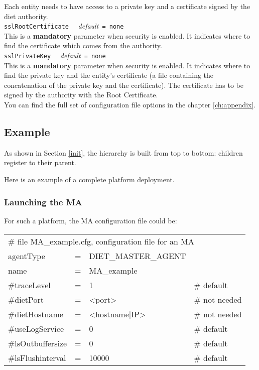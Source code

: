 Each entity needs to have access to a private key and a certificate signed by
the diet authority.\\

\noindent
\texttt{sslRootCertificate} \ \ \emph{default}\texttt{ = none}\\
This is a \textbf{mandatory} parameter when security is enabled. It indicates
where to find the \diet certificate which comes from the authority.\\

\noindent
\texttt{sslPrivateKey} \ \ \emph{default}\texttt{ = none}\\
This is a \textbf{mandatory} parameter when security is enabled. It indicates
where to find the private key and the entity's certificate (a file containing
the concatenation of the private key and the certificate). The certificate
has to be signed by the authority with the Root Certificate.\\

You can find the full set of \diet configuration file options in the chapter
\ref{ch:appendix}.

\subsection{Example}
\label{sec:deploy_ex}

As shown in Section \ref{init}, the hierarchy is built from top to bottom:
children register to their parent.

Here is an example of a complete platform deployment.
\subsubsection{Launching the MA}

For such a platform, the MA configuration file could be:
\tt
\begin{center}
 \footnotesize
 \begin{tabular}{lcll}
  \multicolumn{4}{l}{\# file MA\_example.cfg, configuration file for an MA}\\
  agentType     &=&DIET\_MASTER\_AGENT&\\
  name          &=&MA\_example        &\\
  \#traceLevel  &=&1                  &\# default\\
  \#dietPort    &=&<port>             &\# not needed\\
  \#dietHostname&=&<hostname|IP>      &\# not needed\\
  \#useLogService &=& 0               &\# default\\
  \#lsOutbuffersize &=& 0             &\# default\\
  \#lsFlushinterval &=& 10000           &\# default\\
 \end{tabular}
\end{center}
\rm

